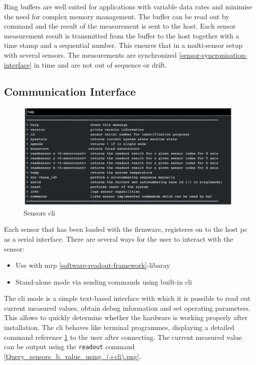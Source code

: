 Ring buffers are well suited for applications with variable data rates
and minimise the need for complex memory management. The buffer can be
read out by command and the result of the measurement is sent to the
host. Each sensor measurement result is transmitted from the buffer to
the host together with a time stamp and a sequential number. This
ensures that in a multi-sensor setup with several sensors. The
measurements are synchronized \ref{sensor-syncronisation-interface} in
time and are not out of sequence or drift.

\hypertarget{communication-interface}{%
\subsection{Communication Interface}\label{communication-interface}}

\begin{figure}
\centering
\includegraphics{./generated_images/border_Sensors_(+cli).png}
\caption{Sensors \gls{cli} \label{Sensors_(+cli).png}}
\end{figure}

Each sensor that has been loaded with the firmware, registeres on to the
host \gls{pc} as a serial interface. There are several ways for the user
to interact with the sensor:

\begin{itemize}
\tightlist
\item
  Use with \gls{mrp} \ref{software-readout-framework}-libaray
\item
  Stand-alone mode via sending commands using built-in \gls{cli}
\end{itemize}

The \gls{cli} mode is a simple text-based interface with which it is
possible to read out current measured values, obtain debug information
and set operating parameters. This allows to quickly determine whether
the hardware is working properly after installation. The \gls{cli}
behaves like terminal programmes, displaying a detailed command
reference \ref{Sensors_(+cli).png} to the user after connecting. The
current measured value can be output using the
\passthrough{\lstinline!readout!} command
\ref{Query_sensors_b_value_using_(+cli).png}.

